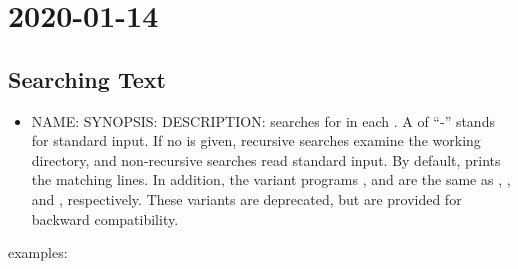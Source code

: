 \section{2020-01-14}
\subsection{Searching Text}
\begin{itemize}
    \item NAME: 
    \subitem SYNOPSIS: 
    \subitem DESCRIPTION:  searches for 
    in each . A  of ``-'' stands for standard input. 
    If no  is given, recursive searches examine the working directory, 
    and non-recursive searches read standard input. 
    By default,  prints the matching lines.
    In addition, the variant programs ,  and 
    are the same as , , and , respectively. 
    These variants are deprecated, but are provided for backward compatibility.
\end{itemize}
 examples:
